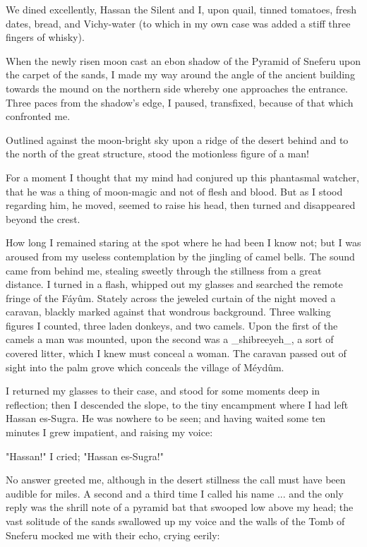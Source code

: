 We dined excellently, Hassan the Silent and I, upon quail, tinned
tomatoes, fresh dates, bread, and Vichy-water (to which in my own case
was added a stiff three fingers of whisky).

When the newly risen moon cast an ebon shadow of the Pyramid of
Sneferu upon the carpet of the sands, I made my way around the angle
of the ancient building towards the mound on the northern side whereby
one approaches the entrance. Three paces from the shadow's edge, I
paused, transfixed, because of that which confronted me.

Outlined against the moon-bright sky upon a ridge of the desert behind
and to the north of the great structure, stood the motionless figure
of a man!

For a moment I thought that my mind had conjured up this phantasmal
watcher, that he was a thing of moon-magic and not of flesh and blood.
But as I stood regarding him, he moved, seemed to raise his head, then
turned and disappeared beyond the crest.

How long I remained staring at the spot where he had been I know not;
but I was aroused from my useless contemplation by the jingling of
camel bells. The sound came from behind me, stealing sweetly through
the stillness from a great distance. I turned in a flash, whipped out
my glasses and searched the remote fringe of the Fáyûm. Stately
across the jeweled curtain of the night moved a caravan, blackly
marked against that wondrous background. Three walking figures I
counted, three laden donkeys, and two camels. Upon the first of the
camels a man was mounted, upon the second was a _shibreeyeh_, a sort
of covered litter, which I knew must conceal a woman. The caravan
passed out of sight into the palm grove which conceals the village of
Méydûm.

I returned my glasses to their case, and stood for some moments deep
in reflection; then I descended the slope, to the tiny encampment
where I had left Hassan es-Sugra. He was nowhere to be seen; and
having waited some ten minutes I grew impatient, and raising my voice:

"Hassan!" I cried; "Hassan es-Sugra!"

No answer greeted me, although in the desert stillness the call must
have been audible for miles. A second and a third time I called his
name ... and the only reply was the shrill note of a pyramid bat that
swooped low above my head; the vast solitude of the sands swallowed up
my voice and the walls of the Tomb of Sneferu mocked me with their
echo, crying eerily:

